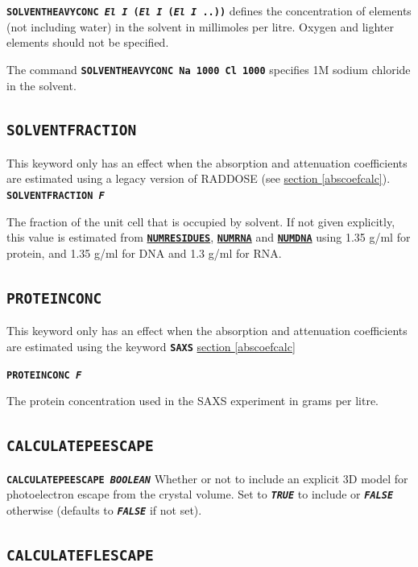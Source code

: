 \documentclass[a4paper]{article}
\newcommand{\Keyword}[1]{\texttt{\textbf{#1}}\xspace}
\newcommand{\SB}{\\[0.2em]}
\newcommand{\RDLegacyKeyword}{This keyword only has an effect when the absorption and attenuation coefficients are estimated using a legacy version of RADDOSE (see \hyperref[abscoefcalc]{section \ref*{abscoefcalc}}).\SB
}
\begin{document}
\noindent \Keyword{SOLVENTHEAVYCONC \textit{El I} (\textit{El I} (\textit{El I} ..))}
defines the concentration of elements (not including water) in the solvent in millimoles per litre. Oxygen and lighter elements should not be specified.

The command \Keyword{SOLVENTHEAVYCONC Na 1000 Cl 1000} specifies 1M sodium chloride in the solvent.


\subsection{\Keyword{SOLVENTFRACTION}}
\label{solventfraction}
\RDLegacyKeyword

\noindent \Keyword{SOLVENTFRACTION \textit{F}}

The fraction of the unit cell that is occupied by solvent. If not given explicitly, this value is estimated from \hyperref[numresidues]{\Keyword{NUMRESIDUES}}, \hyperref[numrna]{\Keyword{NUMRNA}} and \hyperref[numdna]{\Keyword{NUMDNA}} using 1.35 g/ml for protein, and 1.35 g/ml for DNA and 1.3 g/ml for RNA.


\subsection{\Keyword{PROTEINCONC}}
\label{proteinconc}
This keyword only has an effect when the absorption and attenuation coefficients are estimated using the keyword \Keyword{SAXS} \hyperref[abscoefcalc]{section \ref*{abscoefcalc}\SB}

\noindent \Keyword{PROTEINCONC \textit{F}}

The protein concentration used in the SAXS experiment in grams per litre.

\subsection{\Keyword{CALCULATEPEESCAPE}}
\label{calculatepeescape}

\noindent \Keyword{CALCULATEPEESCAPE \textit{BOOLEAN}}
Whether or not to include an explicit 3D model for photoelectron escape from the crystal volume. Set to \Keyword{\textit{TRUE}} to include or \Keyword{\textit{FALSE}} otherwise (defaults to \Keyword{\textit{FALSE}} if not set). 

\subsection{\Keyword{CALCULATEFLESCAPE}}
\label{calculateflescape}
\end{document}

